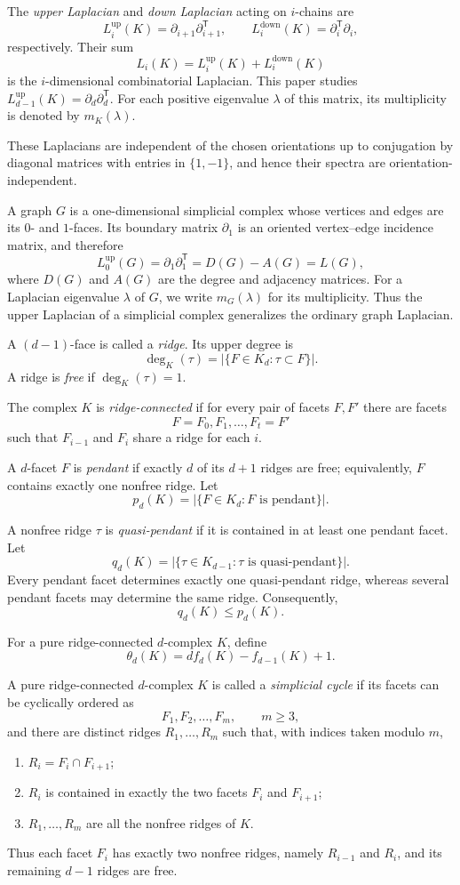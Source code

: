 \documentclass[12pt]{article}
\theoremstyle{remark}
\begin{document}
The \emph{upper Laplacian} and \emph{down Laplacian} acting on $i$-chains are
\[
L_i^{\mathrm{up}}(K)
=\partial_{i+1}\partial_{i+1}^{\mathsf T},
\qquad
L_i^{\mathrm{down}}(K)
=\partial_i^{\mathsf T}\partial_i,
\]
respectively.  Their sum
\[
L_i(K)
=L_i^{\mathrm{up}}(K)+L_i^{\mathrm{down}}(K)
\]
is the $i$-dimensional combinatorial Laplacian.  This paper studies
\(
L_{d-1}^{\mathrm{up}}(K)
=\partial_d\partial_d^{\mathsf T}.
\)
For each positive eigenvalue $\lambda$ of this matrix, its multiplicity is denoted by $m_K(\lambda)$.

These Laplacians are independent of the chosen orientations up to conjugation by diagonal matrices with entries in $\{1,-1\}$, and hence their spectra are orientation-independent.

A graph $G$ is a one-dimensional simplicial complex whose vertices and edges are its $0$- and $1$-faces.  Its boundary matrix $\partial_1$ is an oriented vertex--edge incidence matrix, and therefore
\[
L_0^{\mathrm{up}}(G)
=\partial_1\partial_1^{\mathsf T}
=D(G)-A(G)
=L(G),
\]
where $D(G)$ and $A(G)$ are the degree and adjacency matrices.  For a
Laplacian eigenvalue $\lambda$ of $G$, we write $m_G(\lambda)$ for its
multiplicity.  Thus the upper Laplacian of a simplicial complex generalizes
the ordinary graph Laplacian.

A $(d-1)$-face is called a \emph{ridge}.  Its upper degree is
\[
\deg_K(\tau)=|\{F\in K_d:\tau\subset F\}|.
\]
A ridge is \emph{free} if $\deg_K(\tau)=1$.

The complex $K$ is \emph{ridge-connected} if for every pair of facets $F,F'$ there are facets
\[
F=F_0,F_1,\ldots,F_t=F'
\]
such that $F_{i-1}$ and $F_i$ share a ridge for each $i$.

A $d$-facet $F$ is \emph{pendant} if exactly $d$ of its $d+1$ ridges are free; equivalently, $F$ contains exactly one nonfree ridge.  Let
\[
p_d(K)=|\{F\in K_d:F\text{ is pendant}\}|.
\]

A nonfree ridge $\tau$ is \emph{quasi-pendant} if it is contained in at least one pendant facet.  Let
\[
q_d(K)=|\{\tau\in K_{d-1}:\tau\text{ is quasi-pendant}\}|.
\]
Every pendant facet determines exactly one quasi-pendant ridge, whereas several pendant facets may determine the same ridge.  Consequently,
\[
q_d(K)\le p_d(K).
\]

For a pure ridge-connected $d$-complex $K$, define
\[
\theta_d(K)=d f_d(K)-f_{d-1}(K)+1.
\]

A pure ridge-connected $d$-complex $K$ is called a \emph{simplicial cycle} if its facets can be cyclically ordered as
\[
F_1,F_2,\ldots,F_m,\qquad m\ge3,
\]
and there are distinct ridges $R_1,\ldots,R_m$ such that, with indices taken modulo $m$,
\begin{enumerate}
\item[(i)] $R_i=F_i\cap F_{i+1}$;
\item[(ii)] $R_i$ is contained in exactly the two facets $F_i$ and $F_{i+1}$;
\item[(iii)] $R_1,\ldots,R_m$ are all the nonfree ridges of $K$.
\end{enumerate}
Thus each facet $F_i$ has exactly two nonfree ridges, namely $R_{i-1}$ and $R_i$, and its remaining $d-1$ ridges are free.
\end{document}
